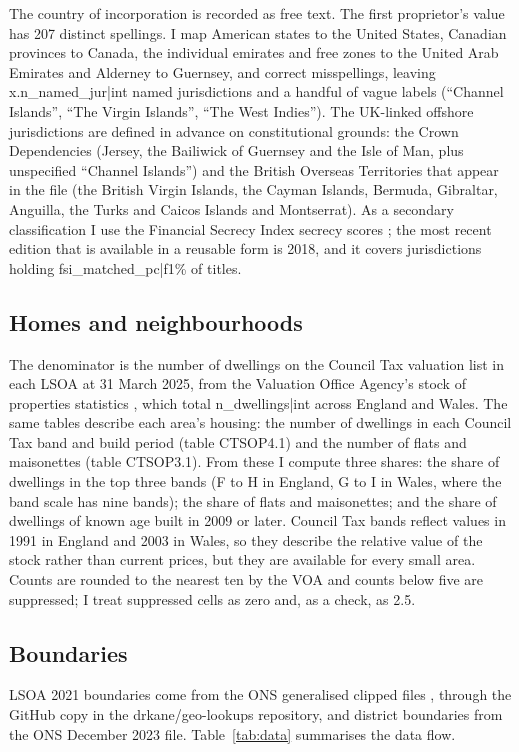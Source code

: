 \documentclass[11pt,a4paper]{article}
\begin{document}
The country of incorporation is recorded as free text. The first proprietor's value has 207 distinct spellings. I map American states to the United States, Canadian provinces to Canada, the individual emirates and free zones to the United Arab Emirates and Alderney to Guernsey, and correct misspellings, leaving {{x.n_named_jur|int}} named jurisdictions and a handful of vague labels (``Channel Islands'', ``The Virgin Islands'', ``The West Indies''). The UK-linked offshore jurisdictions are defined in advance on constitutional grounds: the Crown Dependencies (Jersey, the Bailiwick of Guernsey and the Isle of Man, plus unspecified ``Channel Islands'') and the British Overseas Territories that appear in the file (the British Virgin Islands, the Cayman Islands, Bermuda, Gibraltar, Anguilla, the Turks and Caicos Islands and Montserrat). As a secondary classification I use the Financial Secrecy Index secrecy scores \citep{tjn2018}; the most recent edition that is available in a reusable form is 2018, and it covers jurisdictions holding {{fsi_matched_pc|f1}}\% of titles.

\subsection{Homes and neighbourhoods}
The denominator is the number of dwellings on the Council Tax valuation list in each LSOA at 31 March 2025, from the Valuation Office Agency's stock of properties statistics \citep{voa2025}, which total {{n_dwellings|int}} across England and Wales. The same tables describe each area's housing: the number of dwellings in each Council Tax band and build period (table CTSOP4.1) and the number of flats and maisonettes (table CTSOP3.1). From these I compute three shares: the share of dwellings in the top three bands (F to H in England, G to I in Wales, where the band scale has nine bands); the share of flats and maisonettes; and the share of dwellings of known age built in 2009 or later. Council Tax bands reflect values in 1991 in England and 2003 in Wales, so they describe the relative value of the stock rather than current prices, but they are available for every small area. Counts are rounded to the nearest ten by the VOA and counts below five are suppressed; I treat suppressed cells as zero and, as a check, as 2.5.

\subsection{Boundaries}
LSOA 2021 boundaries come from the ONS generalised clipped files \citep{ons2021lsoa}, through the GitHub copy in the drkane/geo-lookups repository, and district boundaries from the ONS December 2023 file. Table~\ref{tab:data} summarises the data flow.
\end{document}
